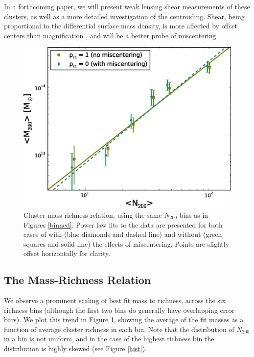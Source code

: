 In a forthcoming paper, we will present weak lensing shear measurements of these clusters, as well as a more detailed investigation of the centroiding. Shear, being proportional to the differential surface mass density, is more affected by offset centers than magnification \citep{Johnston07}, and will be a better probe of miscentering.




\begin{figure}
\begin{center}
\includegraphics[scale=0.7]{plots_ch3/MassRich_2to1000_U.eps}
\caption[Mass-Richness Relation from Magnification]{Cluster mass-richness relation, using the same $N_{200}$ bins as in Figures \ref{binned}. Power law fits to the data are presented for both cases of with (blue diamonds and dashed line) and without (green squares and solid line) the effects of miscentering. Points are slightly offset horizontally for clarity.}
\label{massrich}
\end{center}
\end{figure}

\subsection{The Mass-Richness Relation}

We observe a prominent scaling of best fit mass to richness, across the six richness bins (although the first two bins do generally have overlapping error bars). We plot this trend in Figure \ref{massrich}, showing the average of the fit masses as a function of average cluster richness in each bin. Note that the distribution of $N_{200}$ in a bin is not uniform, and in the case of the highest richness bin the distribution is highly skewed (see Figure \ref{hist}).

